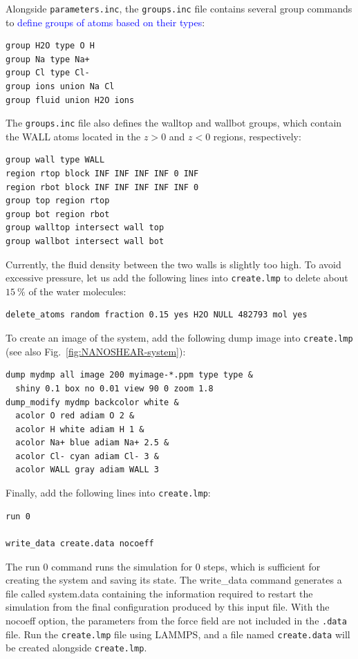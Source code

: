 \documentclass[9pt,tutorial]{livecoms}
\newcommand{\lmpcmd}[1]{\hspace{0pt}\colorbox{listing}{\textcolor{command}{\small{#1}}}\hspace{0pt}} %
\newcommand{\flecmd}[1]{\textcolor{command}{\texttt{#1}}} %
\begin{document}
Alongside \flecmd{parameters.inc}, the \flecmd{groups.inc} file contains
several \lmpcmd{group} commands to \textcolor{blue}{define groups of atoms based
on their types}:
\begin{lstlisting}
group H2O type O H
group Na type Na+
group Cl type Cl-
group ions union Na Cl
group fluid union H2O ions
\end{lstlisting}
The \flecmd{groups.inc} file also defines the \lmpcmd{walltop} and \lmpcmd{wallbot}
groups, which contain the WALL atoms located in the $z > 0$ and $z < 0$ regions, respectively:
\begin{lstlisting}
group wall type WALL
region rtop block INF INF INF INF 0 INF
region rbot block INF INF INF INF INF 0
group top region rtop
group bot region rbot
group walltop intersect wall top
group wallbot intersect wall bot
\end{lstlisting}

Currently, the fluid density between the two walls is slightly too high.  To avoid
excessive pressure, let us add the following lines into \flecmd{create.lmp}
to delete about $15~\%$ of the water molecules:
\begin{lstlisting}
delete_atoms random fraction 0.15 yes H2O NULL 482793 mol yes
\end{lstlisting}

To create an image of the system, add the following \lmpcmd{dump} image
into \flecmd{create.lmp} (see also Fig.~\ref{fig:NANOSHEAR-system}):
\begin{lstlisting}
dump mydmp all image 200 myimage-*.ppm type type &
  shiny 0.1 box no 0.01 view 90 0 zoom 1.8
dump_modify mydmp backcolor white &
  acolor O red adiam O 2 &
  acolor H white adiam H 1 &
  acolor Na+ blue adiam Na+ 2.5 &
  acolor Cl- cyan adiam Cl- 3 &
  acolor WALL gray adiam WALL 3
\end{lstlisting}

Finally, add the following lines into \flecmd{create.lmp}:
\begin{lstlisting}
run 0

write_data create.data nocoeff
\end{lstlisting}
The \lmpcmd{run 0} command runs the simulation for 0 steps, which is sufficient for
creating the system and saving its state.  The \lmpcmd{write\_data} command
generates a file called \lmpcmd{system.data} containing the information required
to restart the simulation from the final configuration produced by this input
file.  With the \lmpcmd{nocoeff} option, the parameters from the force field are
not included in the \flecmd{.data} file.  Run the \flecmd{create.lmp} file using LAMMPS,
and a file named \flecmd{create.data} will be created alongside \flecmd{create.lmp}.
\end{document}
